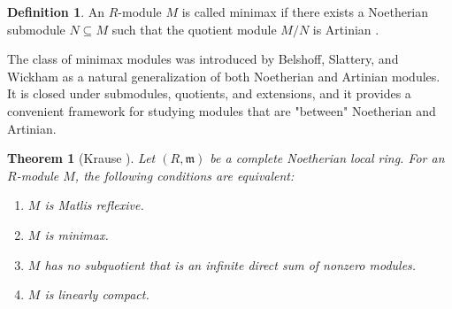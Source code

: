 \documentclass{kms-c}
\theoremstyle{plain}
\newtheorem{theorem}{Theorem}[section]
\theoremstyle{definition}
\newtheorem*{definition}{Definition}
\theoremstyle{remark}
\begin{document}
\begin{definition}
\label{def:minimax}
An \( R \)-module \( M \) is called {minimax} if there exists a Noetherian submodule \( N \subseteq M \) such that the quotient module \( M/N \) is Artinian \cite{Belshoff1996a}.
\end{definition}

The class of minimax modules was introduced by Belshoff, Slattery, and Wickham as a natural generalization of both Noetherian and Artinian modules. It is closed under submodules, quotients, and extensions, and it provides a convenient framework for studying modules that are "between" Noetherian and Artinian.

\begin{theorem}[Krause \cite{Krause2025}]
\label{thm:main-characterization}
Let \( (R, \mathfrak{m}) \) be a complete Noetherian local ring. For an \( R \)-module \( M \), the following conditions are equivalent:
\begin{enumerate}
\item \( M \) is Matlis reflexive.
\item \( M \) is minimax.
\item \( M \) has no subquotient that is an infinite direct sum of nonzero modules.
\item \( M \) is linearly compact.
\end{enumerate}
\end{theorem}
\end{document}
